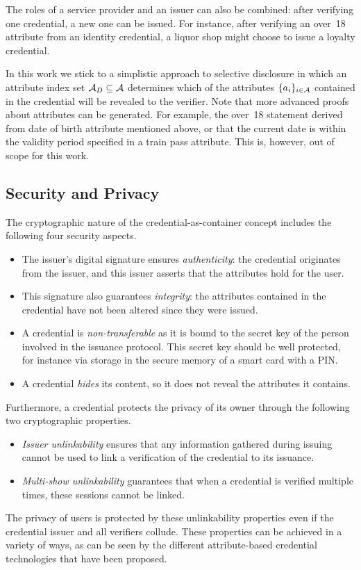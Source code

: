 The roles of a service provider and an issuer can also be combined: after
verifying one credential, a new one can be issued. For instance, after verifying
an \textsf{over~18} attribute from an identity credential, a liquor shop might
choose to issue a \textsf{loyalty} credential.

In this work we stick to a simplistic approach to selective disclosure in which
an attribute index set $\mathcal{A}_D \subseteq \mathcal{A}$ determines which of the attributes
$\{a_i\}_{i \in \mathcal{A}}$ contained in the credential will be revealed to the
verifier. Note that more advanced proofs about attributes can be generated. For
example, the \textsf{over~18} statement derived from \textsf{date of birth}
attribute mentioned above, or that the current date is within the validity
period specified in a \textsf{train pass} attribute. This is, however, out of
scope for this work.

\subsection{Security and Privacy}

The cryptographic nature of the credential-as-container concept includes the
following four security aspects.
\begin{itemize}
  \item The issuer's digital signature ensures \emph{authenticity}:
     the credential originates from the issuer, and this
    issuer asserts that the attributes hold for the user.
  \item This signature also guarantees \emph{integrity}:  the
    attributes contained in the credential have not been altered since they were
    issued.
  \item A credential is \emph{non-transferable} as
    it is bound to the secret key of the person involved in the issuance
    protocol. This secret key should be well protected, for instance via storage
    in the secure memory of a smart card with a PIN.
  \item A credential \emph{hides} its content, so it does not
    reveal the attributes it contains.
\end{itemize}
Furthermore, a credential protects the privacy of its owner
through the following two cryptographic properties.
\begin{itemize}
  \item \emph{Issuer unlinkability} ensures that any information gathered
    during issuing cannot be used to link a verification of the credential to
    its issuance.
  \item \emph{Multi-show unlinkability} guarantees that when a credential is
    verified multiple times, these sessions cannot be linked.
\end{itemize}
The privacy of users is protected by these unlinkability properties even if the
credential issuer and all verifiers collude. These properties can be achieved in
a variety of ways, as can be seen by the different attribute-based credential
technologies that have been proposed.

